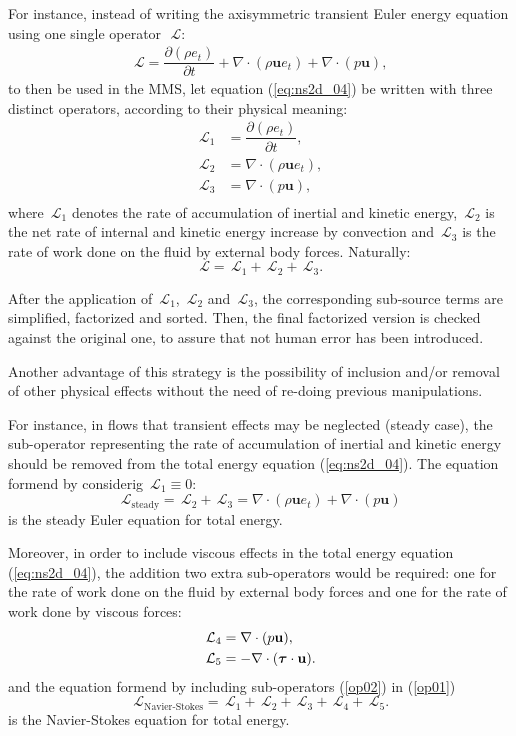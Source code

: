 \documentclass[10pt]{article}
\newcommand{\bv}[1]{\ensuremath{\mbox{\boldmath$ #1 $}}}
\newcommand{\Diff}[2] {\dfrac{\partial( #1)}{\partial #2}}
\newcommand{\Lo}{\,\mathcal{L}}
\begin{document}
For instance, instead of writing the axisymmetric transient Euler energy equation using one single operator~$\Lo$:
\begin{equation}
 \label{eq:ns2d_04}
\begin{split}
\Lo= \Diff{\rho e_t}{t}+\nabla \cdot (\rho\mathbf{u}e_t)+ \nabla\cdot(p  \mathbf{u}) ,
\end{split}
\end{equation}
to then be used in the MMS, let equation (\ref{eq:ns2d_04}) be written with three distinct operators, according to their physical meaning:
\begin{equation}
 \begin{split}\label{op01}
  \Lo_1&=\Diff{\rho e_t}{t},\\
  \Lo_2&=\nabla \cdot (\rho\mathbf{u}e_t),\\
  \Lo_3&= \nabla\cdot(p  \mathbf{u}),\\
   \end{split}
\end{equation}
where $\Lo_1$ denotes the rate of accumulation of inertial and kinetic energy, $\Lo_2$ is the net rate of internal and kinetic energy increase by convection and  $\Lo_3$ is the rate of work done on the fluid by external body forces. Naturally:
$$\Lo=\Lo_1+\Lo_2+\Lo_3.$$


 After the application of $\Lo_1$, $\Lo_2$ and $\Lo_3$, the corresponding sub-source terms are simplified, factorized and sorted. Then, the final factorized version is checked against the original one, to assure that not human error has been introduced.

Another advantage of this strategy is the possibility of inclusion and/or removal of other physical effects without the need of re-doing previous manipulations.



For instance, in flows that transient effects may be neglected (steady case), the sub-operator representing the rate of accumulation of inertial and kinetic energy should be removed from the total energy equation (\ref{eq:ns2d_04}). The equation formend  by considerig $  \Lo_1 \equiv 0 $:
$$\Lo_{\text{steady}}=\Lo_2+\Lo_3=\nabla \cdot (\rho\mathbf{u}e_t)+ \nabla\cdot(p  \mathbf{u})$$
is the steady Euler equation for total energy.


Moreover, in order to include viscous effects in the total energy equation (\ref{eq:ns2d_04}), the addition two extra sub-operators would be required: one for the rate of work done on the fluid by external body forces and one for the rate of work done by viscous forces:
\begin{equation}
 \begin{split}\label{op02}
\Lo_4&= \nabla\cdot(p  \mathbf{u}),\\
  \Lo_5&=- \nabla \cdot (\bv{\tau} \cdot \mathbf{u}).
 \end{split}
\end{equation}
and the equation formend  by including sub-operators (\ref{op02}) in (\ref{op01})
$$\Lo_\text{Navier-Stokes}=\Lo_1+\Lo_2+\Lo_3+\Lo_4+\Lo_5.$$
is the Navier-Stokes equation for total energy.
\end{document}
